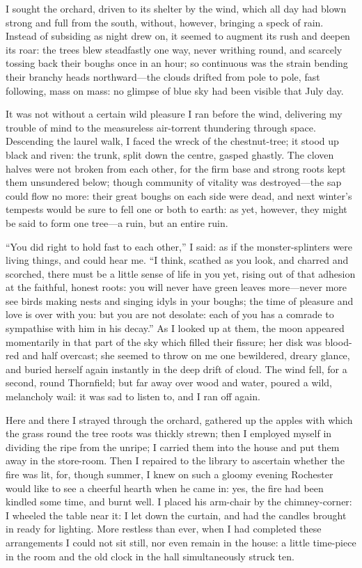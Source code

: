 I sought the orchard, driven to its shelter by the wind, which all day
had blown strong and full from the south, without, however, bringing a
speck of rain.  Instead of subsiding as night drew on, it seemed to
augment its rush and deepen its roar: the trees blew steadfastly one
way, never writhing round, and scarcely tossing back their boughs once
in an hour; so continuous was the strain bending their branchy heads
northward---the clouds drifted from pole to pole, fast following, mass
on mass: no glimpse of blue sky had been visible that July day.

It was not without a certain wild pleasure I ran before the wind,
delivering my trouble of mind to the measureless air-torrent thundering
through space.  Descending the laurel walk, I faced the wreck of the
chestnut-tree; it stood up black and riven: the trunk, split down the
centre, gasped ghastly.  The cloven halves were not broken from each
other, for the firm base and strong roots kept them unsundered below;
though community of vitality was destroyed---the sap could flow no more:
their great boughs on each side were dead, and next winter's tempests
would be sure to fell one or both to earth: as yet, however, they might
be said to form one tree---a ruin, but an entire ruin.

\enquote{You did right to hold fast to each other,} I said: as if the
monster-splinters were living things, and could hear me.  \enquote{I
	think, scathed as you look, and charred and scorched, there must be a
	little sense of life in you yet, rising out of that adhesion at the
	faithful, honest roots: you will never have green leaves more---never
	more see birds making nests and singing idyls in your boughs; the time
	of pleasure and love is over with you: but you are not desolate: each of
	you has a comrade to sympathise with him in his decay.}  As I looked up
at them, the moon appeared momentarily in that part of the sky which
filled their fissure; her disk was blood-red and half overcast; she
seemed to throw on me one bewildered, dreary glance, and buried herself
again instantly in the deep drift of cloud.  The wind fell, for a
second, round Thornfield; but far away over wood and water, poured a
wild, melancholy wail: it was sad to listen to, and I ran off again.

Here and there I strayed through the orchard, gathered up the apples
with which the grass round the tree roots was thickly strewn; then I
employed myself in dividing the ripe from the unripe; I carried them
into the house and put them away in the store-room.  Then I repaired to
the library to ascertain whether the fire was lit, for, though summer, I
knew on such a gloomy evening \Mr{} Rochester would like to see a cheerful
hearth when he came in: yes, the fire had been kindled some time, and
burnt well.  I placed his arm-chair by the chimney-corner: I wheeled the
table near it: I let down the curtain, and had the candles brought in
ready for lighting.  More restless than ever, when I had completed these
arrangements I could not sit still, nor even remain in the house: a
little time-piece in the room and the old clock in the hall
simultaneously struck ten.

